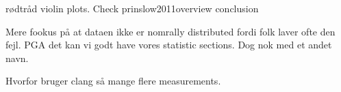rødtråd
violin plots.
Check prinslow2011overview conclusion

Mere fookus på at dataen ikke er nomrally distributed fordi folk laver ofte den fejl. PGA det kan vi godt have vores statistic sections. Dog nok med et andet navn. 

Hvorfor bruger clang så mange flere measurements.



